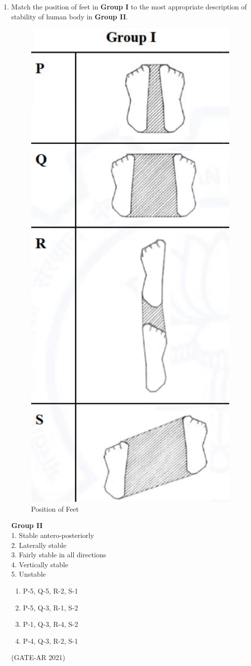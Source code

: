 \documentclass[a4paper,10pt]{article}
\begin{document}
\begin{enumerate}
    \item Match the position of feet in \textbf{Group I} to the most appropriate description of stability of human body in \textbf{Group II}. \\
	    \begin{figure}[h!]
    \includegraphics[width=0.25\columnwidth]{figs/10.jpg}
    \caption{Position of Feet}
    \label{fig:Img10}
    \end{figure}
    \newpage
    \textbf{Group II} \\
    1. Stable antero-posteriorly \\
    2. Laterally stable \\
    3. Fairly stable in all directions \\
    4. Vertically stable \\
    5. Unstable \\
    \begin{multicols}{2}
    \begin{enumerate}
        \item P-5, Q-5, R-2, S-1
        \item P-5, Q-3, R-1, S-2
        \item P-1, Q-3, R-4, S-2
        \item P-4, Q-3, R-2, S-1
    \end{enumerate}
    \end{multicols}
    \hfill (GATE-AR 2021)


\end{enumerate}
\end{document}
